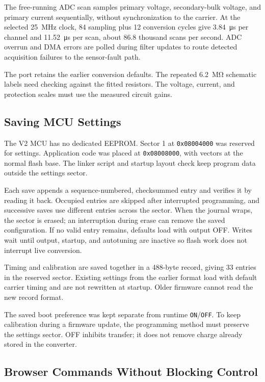 The free-running ADC scan samples primary voltage, secondary-bulk voltage, and primary current sequentially, without synchronization to the carrier. At the selected \SI{25}{\mega\hertz} clock, 84 sampling plus 12 conversion cycles give \SI{3.84}{\micro\second} per channel and \SI{11.52}{\micro\second} per scan, about 86.8 thousand scans per second. ADC overrun and DMA errors are polled during filter updates to route detected acquisition failures to the sensor-fault path.

The port retains the earlier conversion defaults. The repeated \SI{6.2}{\mega\ohm} schematic labels need checking against the fitted resistors. The voltage, current, and protection scales must use the measured circuit gains.

\subsection{Saving MCU Settings}

The V2 MCU has no dedicated EEPROM. Sector 1 at \texttt{0x08004000} was reserved for settings. Application code was placed at \texttt{0x08008000}, with vectors at the normal flash base. The linker script and startup layout check keep program data outside the settings sector.

Each save appends a sequence-numbered, checksummed entry and verifies it by reading it back. Occupied entries are skipped after interrupted programming, and successive saves use different entries across the sector. When the journal wraps, the sector is erased; an interruption during erase can remove the saved configuration. If no valid entry remains, defaults load with output OFF. Writes wait until output, startup, and autotuning are inactive so flash work does not interrupt live conversion.

Timing and calibration are saved together in a 488-byte record, giving 33 entries in the reserved sector. Existing settings from the earlier format load with default carrier timing and are not rewritten at startup. Older firmware cannot read the new record format.

The saved boot preference was kept separate from runtime \texttt{ON}/\texttt{OFF}. To keep calibration during a firmware update, the programming method must preserve the settings sector. OFF inhibits transfer; it does not remove charge already stored in the converter.

\subsection{Browser Commands Without Blocking Control}

